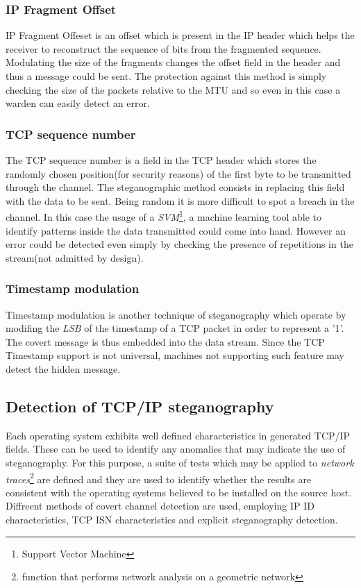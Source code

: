 \documentclass[../../main.tex]{subfiles}
\begin{document}
\subsubsection{IP Fragment Offset} IP Fragment Offeset is an offset which is
present in the IP header which helps the receiver to reconstruct the sequence of
bits from the fragmented sequence.
Modulating the size of the fragments changes the offset field in the header
and thus a message could be sent.
The protection against this method is simply checking the size of the
packets relative to the MTU and so even in this case a warden can easily
detect an error.

\subsubsection{TCP sequence number} The TCP sequence number is a field in the
TCP header which stores the randomly chosen position(for security reasons) of
the first byte to be transmitted through the channel. The steganographic method
consists in replacing this field with the data to be sent.
Being random it is more difficult to spot a breach in the channel.
In this case the usage of a \emph{SVM}\footnote{Support Vector Machine}, a
machine learning tool able to identify patterns inside the data transmitted
could come into hand.
However an error could be detected even simply by checking the presence of
repetitions in the stream(not admitted by design). 

\subsubsection{Timestamp modulation} Timestamp modulation is another technique
of steganography which operate by modifing the \emph{LSB} of the timestamp of a
TCP packet in order to represent a '1'.
The covert message is thus embedded into the data stream.
Since the TCP Timestamp support is not universal, machines not supporting
such feature may detect the hidden message.


\subsection{Detection of TCP/IP steganography}

Each operating system exhibits well defined characteristics in generated
TCP/IP fields. These can be used to identify any anomalies that may indicate 
the use of steganography. For this purpose, a suite of tests which may be
applied to \emph{network traces}\footnote{function that performs network
analysis on a geometric network} are defined and they are used to identify
whether the results are consistent with the operating systems believed to be
installed on the source host.
Diffreent methods of covert channel detection are used, employing IP ID 
characteristics, TCP ISN characteristics and explicit steganography
detection.
\end{document}
